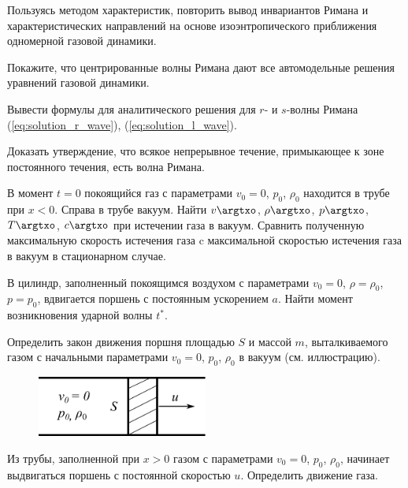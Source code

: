 \documentclass[a4paper, 14pt]{extarticle}
\begin{document}
\begin{problems}
	
	\item 
	Пользуясь методом характеристик, повторить вывод инвариантов Римана и характеристических направлений на основе изоэнтропического приближения одномерной газовой динамики.
	
	\item 
	Покажите, что центрированные волны Римана дают все автомодельные решения уравнений газовой динамики.	
	
	\item 
	Вывести формулы для аналитического решения для $r$- и $s$-волны Римана (\ref{eq:solution_r_wave}), (\ref{eq:solution_l_wave}).

	\item 
	Доказать утверждение, что всякое непрерывное течение, примыкающее к зоне постоянного течения, есть волна Римана.
	
	\item
	В момент $t=0$  покоящийся газ с параметрами $v_0 = 0$, $p_0$, $\rho_0$ находится в трубе при $x<0$. Справа в трубе вакуум. Найти $v\argtxo$, $\rho\argtxo$, $p\argtxo$, $T\argtxo$, $c\argtxo$ при истечении газа в вакуум. Сравнить полученную максимальную скорость истечения газа c максимальной скоростью истечения газа в вакуум в стационарном случае.
	
	
	\item 
	В цилиндр, заполненный покоящимся воздухом с параметрами $v_0 = 0$, $\rho=\rho_0$, $p=p_0$, вдвигается поршень с постоянным ускорением $a$. Найти момент возникновения ударной волны $t^*$.
	
	\item
	Определить закон движения поршня площадью $S$ и массой $m$, выталкиваемого газом с начальными параметрами $v_0=0$, $p_0$, $\rho_0$ в вакуум (см. иллюстрацию).

	\begin{figure}[h!]
		\centering
		\includegraphics[width=0.5\textwidth]{../img/piston_u.pdf}
	\end{figure}
	
	\item 
	Из трубы, заполненной при $x>0$ газом с параметрами  $v_0=0$, $p_0$, $\rho_0$, начинает выдвигаться поршень с постоянной скоростью $u$. Определить движение газа.

\end{problems}
\end{document}
